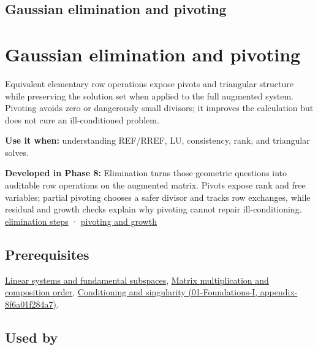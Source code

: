 \hypertarget{appendix-f6e77f4a200f}{}
\section*{Gaussian elimination and pivoting}
\chapter{Gaussian elimination and pivoting}\label{appendix-f6e77f4a200f-gaussian-elimination-and-pivoting}

Equivalent elementary row operations expose pivots and triangular structure while preserving the solution set when applied to the full augmented system. Pivoting avoids zero or dangerously small divisors; it improves the calculation but does not cure an ill-conditioned problem.

\textbf{Use it when:} understanding REF/RREF, LU, consistency, rank, and triangular solves.

\textbf{Developed in Phase 8:} Elimination turns those geometric questions into auditable row operations on the augmented matrix. Pivots expose rank and free variables; partial pivoting chooses a safer divisor and tracks row exchanges, while residual and growth checks explain why pivoting cannot repair ill-conditioning. \href{Continuous\%20Notes/Computing\%20Foundations\%20-\%20From\%20Bits\%20to\%20C++\%20and\%20Systems\%20APIs\#Elimination\%20turns\%20the\%20geometry\%20into\%20an\%20auditable\%20calculation}{elimination steps} · \href{Continuous\%20Notes/Computing\%20Foundations\%20-\%20From\%20Bits\%20to\%20C++\%20and\%20Systems\%20APIs\#Pivoting\%20separates\%20algorithm\%20failure\%20from\%20matrix\%20failure}{pivoting and growth}

\section{Prerequisites}\label{appendix-f6e77f4a200f-prerequisites}

\hyperref[appendix-8572a4a060c1]{Linear systems and fundamental subspaces}, \hyperref[appendix-ab31ef447dbf]{Matrix multiplication and composition order}, \href{../01-Foundations-I/main.pdf\#nameddest=appendix-8f6a01f284a7}{Conditioning and singularity (01-Foundations-I, appendix-8f6a01f284a7)}.

\section{Used by}\label{appendix-f6e77f4a200f-used-by}

